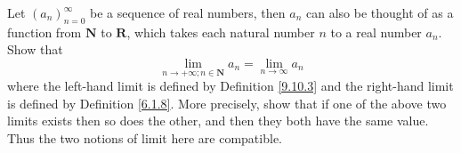 \exercisesection

\begin{exercise}\label{ex 9.10.1}
    Let \((a_n)_{n = 0}^\infty\) be a sequence of real numbers, then \(a_n\) can also be thought of as a function from \(\mathbf{N}\) to \(\mathbf{R}\), which takes each natural number \(n\) to a real number \(a_n\).
    Show that
    \[
        \lim_{n \to +\infty ; n \in \mathbf{N}} a_n = \lim_{n \to \infty} a_n
    \]
    where the left-hand limit is defined by Definition \ref{9.10.3} and the right-hand limit is defined by Definition \ref{6.1.8}.
    More precisely, show that if one of the above two limits exists then so does the other, and then they both have the same value.
    Thus the two notions of limit here are compatible.
\end{exercise}

